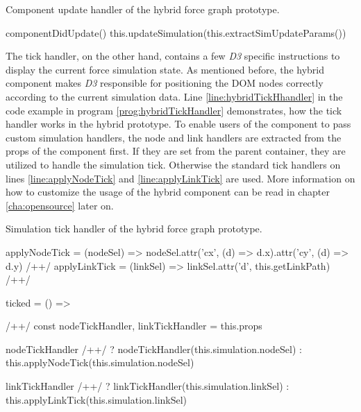 \begin{program}
\caption{Component update handler of the hybrid force graph prototype.}
\label{prog:hybridUpdateHandler}
\begin{JsCode}
componentDidUpdate() {
  this.updateSimulation(this.extractSimUpdateParams())
}
\end{JsCode}
\end{program}

The tick handler, on the other hand, contains a few \emph{D3} specific instructions to display the current force simulation state. As mentioned before, the hybrid component makes \emph{D3} responsible for positioning the DOM nodes correctly according to the current simulation data. Line \ref{line:hybridTickHhandler} in the code example in program \ref{prog:hybridTickHandler} demonstrates, how the tick handler works in the hybrid prototype. To enable users of the component to pass custom simulation handlers, the node and link handlers are extracted from the props of the component first. If they are set from the parent container, they are utilized to handle the simulation tick. Otherwise the standard tick handlers on lines \ref{line:applyNodeTick} and \ref{line:applyLinkTick} are used. More information on how to customize the usage of the hybrid component can be read in chapter \ref{cha:opensource} later on.

\begin{program}
\caption{Simulation tick handler of the hybrid force graph prototype.}
\label{prog:hybridTickHandler}
\begin{JsCode}
applyNodeTick = (nodeSel) => nodeSel.attr('cx', (d) => d.x).attr('cy', (d) => d.y) /+\label{line:applyNodeTick}+/
applyLinkTick = (linkSel) => linkSel.attr('d', this.getLinkPath) /+\label{line:applyLinkTick}+/

ticked = () => { /+\label{line:hybridTickHhandler}+/
  const { nodeTickHandler, linkTickHandler } = this.props

  nodeTickHandler /+\label{line:decideNodeTickHandler}+/
    ? nodeTickHandler(this.simulation.nodeSel)
    : this.applyNodeTick(this.simulation.nodeSel)

  linkTickHandler /+\label{line:decideLinkTickHandler}+/
    ? linkTickHandler(this.simulation.linkSel)
    : this.applyLinkTick(this.simulation.linkSel)
}
\end{JsCode}
\end{program}

